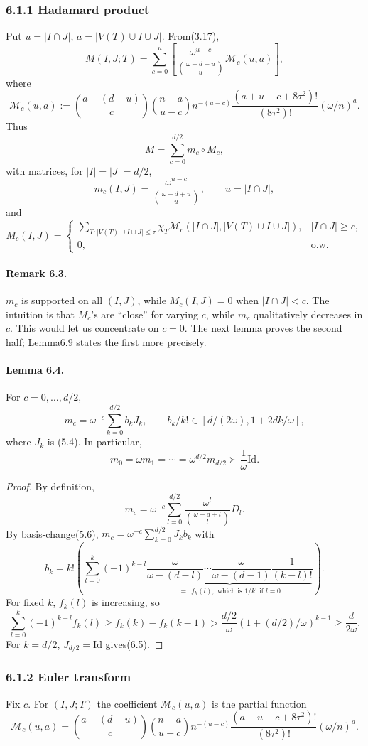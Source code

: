 \documentclass[10pt,a4paper]{article}
\begin{document}
\subsubsection*{6.1.1 Hadamard product}
Put $u=|I\cap J|$, $a=|V(T)\cup I\cup J|$. From(3.17),
\[M(I,J;T)=\sum_{c=0}^u\left[\frac{\omega^{u-c}}{\binom{\omega-d+u}u}\mathcal M_c(u,a)\right],\tag{6.1}\]
where
\[\mathcal M_c(u,a):=\binom{a-(d-u)}c\binom{n-a}{u-c}n^{-(u-c)}\frac{(a+u-c+8\tau^2)!}{(8\tau^2)!}(\omega/n)^a.\]
Thus
\[M=\sum_{c=0}^{d/2}m_c\circ M_c,\tag{6.2}\]
with matrices, for $|I|=|J|=d/2$,
\[m_c(I,J)=\frac{\omega^{u-c}}{\binom{\omega-d+u}u},\qquad u=|I\cap J|,\tag{6.3}\]
and
\[M_c(I,J)=\begin{cases}\sum_{T:|V(T)\cup I\cup J|\le\tau}\chi_T\mathcal M_c(|I\cap J|,|V(T)\cup I\cup J|),&|I\cap J|\ge c,\\0,&\text{o.w.}\end{cases}\tag{6.4}\]
\paragraph{Remark 6.3.} $m_c$ is supported on all $(I,J)$, while $M_c(I,J)=0$ when $|I\cap J|<c$. The intuition is that $M_c$'s are ``close'' for varying $c$, while $m_c$ qualitatively decreases in $c$. This would let us concentrate on $c=0$. The next lemma proves the second half; Lemma6.9 states the first more precisely.
\paragraph{Lemma 6.4.} For $c=0,\ldots,d/2$,
\[m_c=\omega^{-c}\sum_{k=0}^{d/2}b_kJ_k,\qquad b_k/k!\in[d/(2\omega),1+2dk/\omega],\]
where $J_k$ is (5.4). In particular,
\[m_0=\omega m_1=\cdots=\omega^{d/2}m_{d/2}\succ\frac1\omega\mathrm{Id}.\tag{6.5}\]
\begin{proof}By definition,
\[m_c=\omega^{-c}\sum_{l=0}^{d/2}\frac{\omega^l}{\binom{\omega-d+l}l}D_l.\]
By basis-change(5.6), $m_c=\omega^{-c}\sum_{k=0}^{d/2}J_kb_k$ with
\[b_k=k!\left(\sum_{l=0}^k(-1)^{k-l}\underbrace{\frac\omega{\omega-(d-l)}\cdots\frac\omega{\omega-(d-1)}\frac1{(k-l)!}}_{=:f_k(l),\text{ which is }1/k!\text{ if }l=0}\right).\]
For fixed $k$, $f_k(l)$ is increasing, so
\[\sum_{l=0}^k(-1)^{k-l}f_k(l)\ge f_k(k)-f_k(k-1)>\frac{d/2}\omega(1+(d/2)/\omega)^{k-1}\ge\frac d{2\omega}.\]
For $k=d/2$, $J_{d/2}=\mathrm{Id}$ gives(6.5).\end{proof}
\subsubsection*{6.1.2 Euler transform}
Fix $c$. For $(I,J;T)$ the coefficient $\mathcal M_c(u,a)$ is the partial function
\[\mathcal M_c(u,a)=\binom{a-(d-u)}c\binom{n-a}{u-c}n^{-(u-c)}\frac{(a+u-c+8\tau^2)!}{(8\tau^2)!}(\omega/n)^a.\tag{6.6}\]
\end{document}
